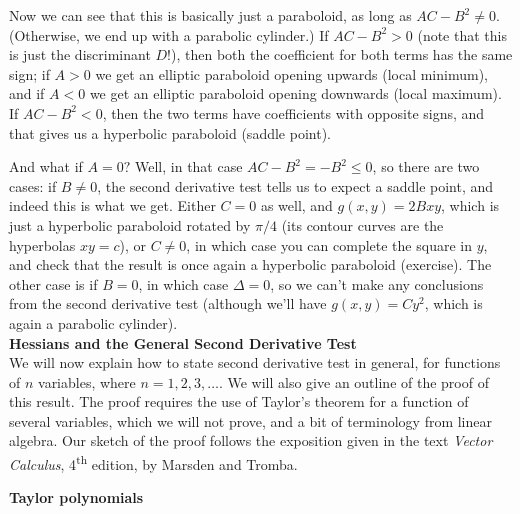 Now we can see that this is basically just a paraboloid, as long as $AC-B^2\neq 0$. (Otherwise, we end up with a parabolic cylinder.) If $AC-B^2>0$ (note that this is just the discriminant $D$!), then both the coefficient for both terms has the same sign; if $A>0$ we get an elliptic paraboloid opening upwards (local minimum), and if $A<0$ we get an elliptic paraboloid opening downwards (local maximum). If $AC-B^2<0$, then the two terms have coefficients with opposite signs, and that gives us a hyperbolic paraboloid (saddle point).

And what if $A=0?$ Well, in that case $AC-B^2=-B^2\leq 0$, so there are two cases: if $B\neq 0$, the second derivative test tells us to expect a saddle point, and indeed this is what we get. Either $C=0$ as well, and $g(x,y) = 2Bxy$, which is just a hyperbolic paraboloid rotated by $\pi/4$ (its contour curves are the hyperbolas $xy=c$), or $C\neq 0$, in which case you can complete the square in $y$, and check that the result is once again a hyperbolic paraboloid (exercise). The other case is if $B=0$, in which case $\Delta =0$, so we can't make any conclusions from the second derivative test (although we'll have $g(x,y)=Cy^2$, which is again a parabolic cylinder).\\


\noindent\textbf{\large Hessians and the General Second Derivative Test}\\

We will now explain how to state second derivative test in general, for functions of $n$ variables, where $n=1,2,3,\ldots$. We will also give an outline of the proof of this result. The proof requires the use of Taylor's theorem for a function of several variables, which we will not prove, and a bit of terminology from linear algebra. Our sketch of the proof follows the exposition given in the text {\em Vector Calculus}, 4\textsuperscript{th} edition, by Marsden and Tromba. 


\noindent\textbf{Taylor polynomials}\\

